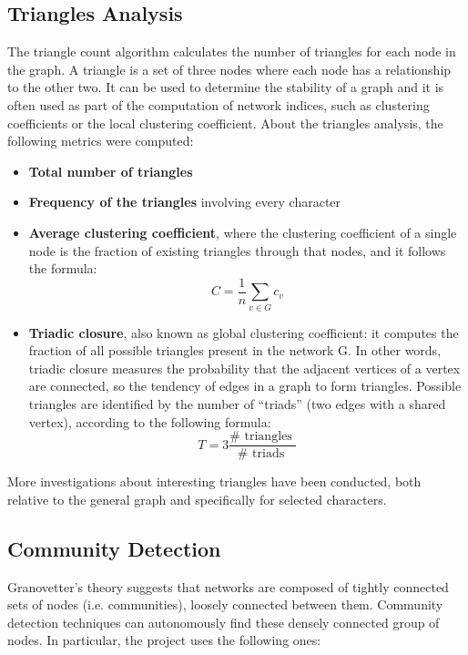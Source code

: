 \documentclass[10pt,twocolumn,letterpaper]{article}
\begin{document}
\subsection{Triangles Analysis}

The triangle count algorithm calculates the number of triangles for each node in the graph. A triangle is a set of three nodes where each node has a relationship to the other two.
It can be used to determine the stability of a graph and it is often used as part of the computation of network indices, such as clustering coefficients or the local clustering coefficient. About the triangles analysis, the following metrics were computed:

\begin{itemize}
    \item \textbf{Total number of triangles}
    \item \textbf{Frequency of the triangles} involving every character
    \item {\textbf{Average clustering coefficient}, where the clustering coefficient of a single node is
    the fraction of existing triangles through that nodes, and it follows the formula:
    $$
    C=\frac{1}{n} \sum_{v \in G} c_{v}
    $$
    }
    \item \textbf{Triadic closure}, also known as global clustering coefficient: it computes the fraction of
    all possible triangles present in the network G. In other words, triadic closure measures
    the probability that the adjacent vertices of a vertex are connected, so the tendency of
    edges in a graph to form triangles.
    Possible triangles are identified by the number of “triads” (two edges with a shared
    vertex), according to the following formula:
    $$
    T=3 \frac{\# \text { triangles }}{\# \text { triads }}
    $$
\end{itemize}

More investigations about interesting triangles have been conducted, both relative to the general graph and specifically for selected characters.

\subsection{Community Detection}

Granovetter’s theory suggests that networks are composed of tightly connected sets of nodes
(i.e. communities), loosely connected between them. Community detection techniques can autonomously find these densely connected group of nodes. In particular, the project uses the following ones:
\end{document}
